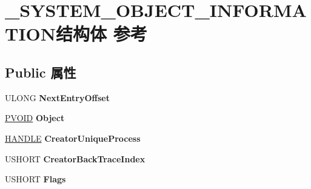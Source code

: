 \hypertarget{struct___s_y_s_t_e_m___o_b_j_e_c_t___i_n_f_o_r_m_a_t_i_o_n}{}\section{\+\_\+\+S\+Y\+S\+T\+E\+M\+\_\+\+O\+B\+J\+E\+C\+T\+\_\+\+I\+N\+F\+O\+R\+M\+A\+T\+I\+O\+N结构体 参考}
\label{struct___s_y_s_t_e_m___o_b_j_e_c_t___i_n_f_o_r_m_a_t_i_o_n}
\subsection*{Public 属性}
\begin{DoxyCompactItemize}
\item 
\mbox{\label{struct___s_y_s_t_e_m___o_b_j_e_c_t___i_n_f_o_r_m_a_t_i_o_n_affa9a08afe581d15267ef7b76b770e13}} 
U\+L\+O\+NG {\bfseries Next\+Entry\+Offset}
\item 
\mbox{\label{struct___s_y_s_t_e_m___o_b_j_e_c_t___i_n_f_o_r_m_a_t_i_o_n_aac7d260b768b48faf4650d878a5d8c54}} 
\hyperlink{interfacevoid}{P\+V\+O\+ID} {\bfseries Object}
\item 
\mbox{\label{struct___s_y_s_t_e_m___o_b_j_e_c_t___i_n_f_o_r_m_a_t_i_o_n_af66c56651345eb82ef61cb472de1a1fa}} 
\hyperlink{interfacevoid}{H\+A\+N\+D\+LE} {\bfseries Creator\+Unique\+Process}
\item 
\mbox{\label{struct___s_y_s_t_e_m___o_b_j_e_c_t___i_n_f_o_r_m_a_t_i_o_n_adbd579237920ad1ec1a01b875cd92798}} 
U\+S\+H\+O\+RT {\bfseries Creator\+Back\+Trace\+Index}
\item 
\mbox{\label{struct___s_y_s_t_e_m___o_b_j_e_c_t___i_n_f_o_r_m_a_t_i_o_n_ab69b2c0ba4422243a099dc7b555b49cd}} 
U\+S\+H\+O\+RT {\bfseries Flags}
\item 
\mbox{\label{struct___s_y_s_t_e_m___o_b_j_e_c_t___i_n_f_o_r_m_a_t_i_o_n_aadb4ed072acd99aab5344c9e45694040}} 

\end{DoxyCompactItemize}
